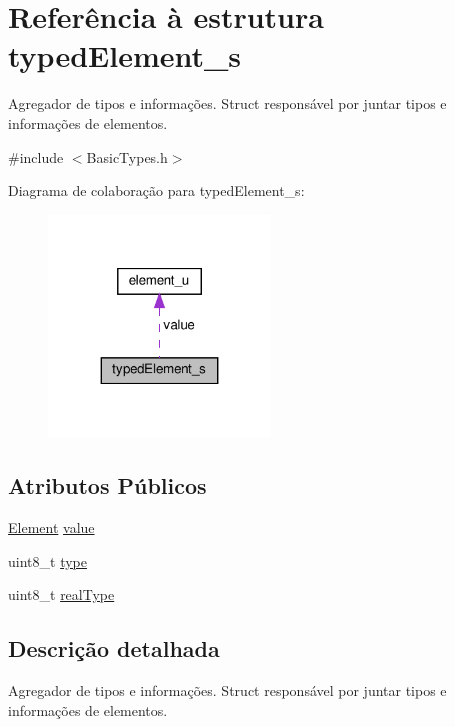 \hypertarget{structtypedElement__s}{}\section{Referência à estrutura typed\+Element\+\_\+s}
\label{structtypedElement__s}


Agregador de tipos e informações. Struct responsável por juntar tipos e informações de elementos.  




{\ttfamily \#include $<$Basic\+Types.\+h$>$}



Diagrama de colaboração para typed\+Element\+\_\+s\+:\nopagebreak
\begin{figure}[H]
\begin{center}
\leavevmode
\includegraphics[width=167pt]{structtypedElement__s__coll__graph}
\end{center}
\end{figure}
\subsection*{Atributos Públicos}
\begin{DoxyCompactItemize}
\item 
\hyperlink{BasicTypes_8h_a8132f4f0515064141e31e606660df561}{Element} \hyperlink{structtypedElement__s_a31beb2ade81f8acacfc312bba3ab2086}{value}
\item 
uint8\+\_\+t \hyperlink{structtypedElement__s_a725ddec1b2a04b6488cdde81f3e0255e}{type}
\item 
uint8\+\_\+t \hyperlink{structtypedElement__s_a265d7ad822f91bfa8fd6eb292e2d20d8}{real\+Type}
\end{DoxyCompactItemize}


\subsection{Descrição detalhada}
Agregador de tipos e informações. Struct responsável por juntar tipos e informações de elementos. 

